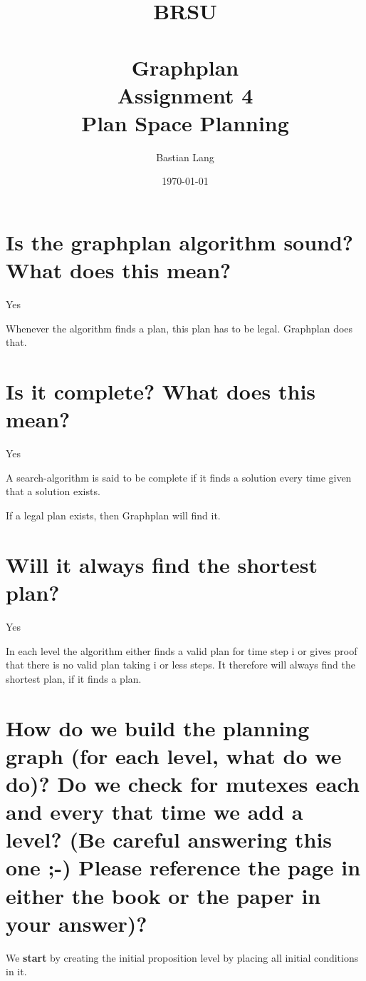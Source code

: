 \documentclass[paper=a4, fontsize=11pt]{scrartcl} %
\title{	
\normalfont \normalsize 
\textsc{BRSU} \\ [25pt] %
\horrule{0.5pt} \\[0.4cm] %
\huge Graphplan\\Assignment 4 \\
Plan Space Planning %
\horrule{2pt} \\[0.5cm] %
}
\author{Bastian Lang} %
\date{\normalsize\today} %
\numberwithin{equation}{section} %
\numberwithin{figure}{section} %
\numberwithin{table}{section} %
\begin{document}
\maketitle %

\section{Is the graphplan algorithm sound? What does this mean?}
Yes\vspace{5mm}

Whenever the algorithm finds a plan, this plan has to be legal. Graphplan does that.
\section{Is it complete? What does this mean?}
Yes\vspace{5mm}

A search-algorithm is said to be complete if it finds a solution every time given that a solution exists.\vspace{5mm}

If a legal plan exists, then Graphplan will find it.

\section{Will it always find the shortest plan?}
Yes\vspace{5mm}

In each level the algorithm either finds a valid plan for time step i or gives proof that there is no valid plan taking i or less steps. It therefore will always find the shortest plan, if it finds a plan.

\section{How do we build the planning graph (for each level, what do we do)? Do we check for mutexes each and every that time we add a level? (Be careful answering this one ;-) Please reference the page in either the book or the paper in your answer)?}

We \textbf{start} by creating the initial proposition level by placing all initial conditions in it.\vspace{5mm}
\end{document}
